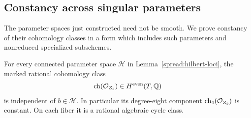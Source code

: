 \subsection{Constancy across singular parameters}

The parameter spaces just constructed need not be smooth.  We prove
constancy of their cohomology classes in a form which includes such
parameters and nonreduced specialized subschemes.

\begin{lemma}
\label{spread:chern-constancy}
For every connected parameter space $\mathcal H$ in
Lemma~\ref{spread:hilbert-loci}, the marked rational cohomology class
\[
 \operatorname{ch}(\mathcal O_{Z_b})\in H^{\mathrm{even}}(T,\mathbb Q)
\]
is independent of $b\in\mathcal H$.  In particular its degree-eight
component $\operatorname{ch}_4(\mathcal O_{Z_b})$ is constant.  On each fiber it is
a rational algebraic cycle class.
\end{lemma}

